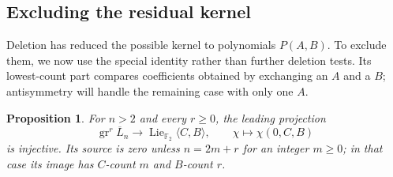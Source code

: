 \documentclass[11pt]{article}
\newtheorem{proposition}[theorem]{Proposition}
\theoremstyle{definition}
\theoremstyle{remark}
\numberwithin{equation}{section}
\begin{document}
\subsection{Excluding the residual kernel}
Deletion has reduced the possible kernel to polynomials $P(A,B)$.
To exclude them, we now use the special identity rather than further
deletion tests.  Its lowest-count part compares coefficients obtained
by exchanging an $A$ and a $B$; antisymmetry will handle the remaining
case with only one $A$.

\begin{proposition}\label{prop:projection-injective}
For $n>2$ and every $r\geq0$, the leading projection
\[
 \operatorname{gr}^{r}\overline L_n\longrightarrow
 \operatorname{Lie}_{{\mathbb F_2}}\langle C,B\rangle,\qquad
 \chi\longmapsto\chi(0,C,B)
\]
is injective.  Its source is zero unless $n=2m+r$ for an integer
$m\geq0$; in that case its image has $C$-count $m$ and $B$-count $r$.
\end{proposition}
\end{document}
